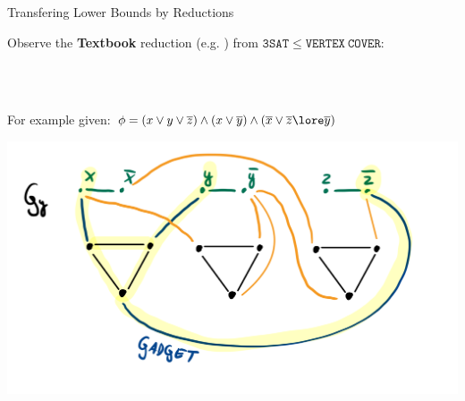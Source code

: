 \begin{frame}[c]{Transfering Lower Bounds by Reductions}

Observe the \textbf{Textbook} reduction (e.g. \cite{redvc}) from $\mathtt{3SAT} \leq \mathtt{VERTEX~COVER}$:

\\~

For example given: $ \phi = (x \lor y \lor \overline{z}) \land (x \lor \overline{y}) \land (\overline{x} \lor \overline{z} \lore \overline{y})$
    \begin{center}
        \includegraphics[scale=0.12]{img/reduce-to-VC.png}
    \end{center}
    
\end{frame}

